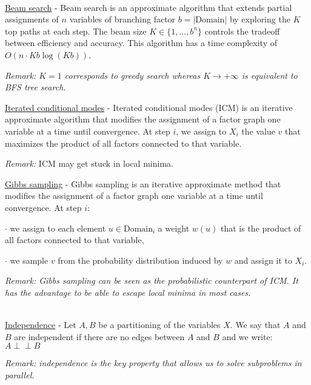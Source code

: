 \documentclass[4pt,landscape]{article}
\begin{document}
\begin{multicols*}{4}
 {\color{magenta}\hrulefill}\\
 {\tiny \underline{Beam search} - Beam search is an approximate algorithm that extends partial assignments of $n$ variables of branching factor $b=|\textrm{Domain}|$ by exploring the $K$ top paths at each step. The beam size $K \in \{1,...,b^n\}$ controls the tradeoff between efficiency and accuracy. This algorithm has a time complexity of $O(n \cdot Kb\log(Kb))$.}\par
 {\tiny \textit{Remark: $K=1$ corresponds to greedy search whereas $K\rightarrow+\infty$ is equivalent to BFS tree search.}}\par
 {\tiny \underline{Iterated conditional modes} - Iterated conditional modes (ICM) is an iterative approximate algorithm that modifies the assignment of a factor graph one variable at a time until convergence. At step $i$, we assign to $X_i$ the value $v$ that maximizes the product of all factors connected to that variable.}\par
 {\tiny \textit{Remark:} ICM may get stuck in local minima.}\par
 {\tiny \underline{Gibbs sampling} - Gibbs sampling is an iterative approximate method that modifies the assignment of a factor graph one variable at a time until convergence. At step $i$:}\par
 {$\cdot$ we assign to each element $u \in \textrm{Domain}_i$ a weight $w(u)$ that is the product of all factors connected to that variable,}\par
 {$\cdot$ we sample $v$ from the probability distribution induced by $w$ and assign it to $X_i$.}\par
 {\tiny \textit{Remark: Gibbs sampling can be seen as the probabilistic counterpart of ICM. It has the advantage to be able to escape local minima in most cases.}}\par
 {\color{magenta} \hrulefill}\\
 {\tiny \underline{Independence} - Let $A,B$ be a partitioning of the variables $X$. We say that $A$ and $B$ are independent if there are no edges between $A$ and $B$ and we write: $A\perp\!\!\!\!\perp B$}\par
 {\tiny \textit{Remark: independence is the key property that allows us to solve subproblems in parallel.}}\par

\end{multicols*}
\end{document}
